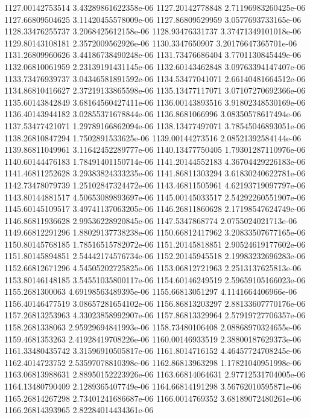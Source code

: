 {1127.00142753514 3.43289861622358e-06
1127.20142778848 2.71196983260425e-06
1127.66809504625 3.11420455578009e-06
1127.86809529959 3.0577693733165e-06
1128.33476255737 3.2068425612158e-06
1128.93476331737 3.37471349101018e-06
1129.80143108181 2.3572009562926e-06
1130.3347650907 3.20176647365701e-06
1131.26809960626 3.44186738490248e-06
1131.73476686404 3.7701130845449e-06
1132.06810061959 2.23139191431145e-06
1132.60143462848 3.09763394147407e-06
1133.73476939737 3.04346581891592e-06
1134.53477041071 2.66140481664512e-06
1134.86810416627 2.37219133865598e-06
1135.13477117071 3.07107270692366e-06
1135.60143842849 3.68164560427411e-06
1136.00143893516 3.91802348530169e-06
1136.40143944182 3.02855371678844e-06
1136.8681066996 3.08350578617494e-06
1137.53477421071 1.29789166862094e-06
1138.13477497071 3.78545046893051e-06
1138.26810847294 1.7502891533625e-06
1139.00144273516 2.08521392584144e-06
1139.86811049961 3.11642452289777e-06
1140.13477750405 1.79301287110976e-06
1140.60144476183 1.78491401150714e-06
1141.20144552183 4.36704429226183e-06
1141.46811252628 3.29383824333235e-06
1141.86811303294 3.61830240622781e-06
1142.73478079739 1.25102847324472e-06
1143.46811505961 4.62193719097797e-06
1143.80144881517 4.50653089893697e-06
1145.00145033517 2.54292260551907e-06
1145.60145109517 3.49741137063205e-06
1146.26811860628 2.17198547624749e-06
1146.86811936628 2.99536228920845e-06
1147.5347868774 2.0755024021713e-06
1149.66812291296 1.88029137738238e-06
1150.66812417962 3.20833507677165e-06
1150.80145768185 1.78516515782072e-06
1151.20145818851 2.90524619177602e-06
1151.80145894851 2.54442174576734e-06
1152.20145945518 2.19983232696283e-06
1152.66812671296 4.54505202725825e-06
1153.06812721963 2.2513137625813e-06
1153.80146148185 3.54551035800117e-06
1154.60146249519 2.59659105166023e-06
1155.2681300063 4.69198563489395e-06
1155.66813051297 4.1141664406966e-06
1156.40146477519 3.08657281654102e-06
1156.86813203297 2.88133607770176e-06
1157.26813253963 4.33023858992907e-06
1157.86813329964 2.57919727706357e-06
1158.2681338063 2.95929694841993e-06
1158.73480106408 2.08868970324655e-06
1159.4681353263 2.41928419708226e-06
1160.00146933519 2.38800187629373e-06
1161.33480435742 3.31596910505817e-06
1161.8014716152 4.46457724708245e-06
1162.4014723752 2.53597078810398e-06
1162.86813963298 1.17821040951998e-06
1163.06813988631 2.88950152223926e-06
1163.66814064631 2.97712531704005e-06
1164.13480790409 2.1289365407749e-06
1164.66814191298 3.56762010595871e-06
1165.26814267298 2.73401241686687e-06
1166.0014769352 3.68189072480261e-06
1166.26814393965 2.82284014434361e-06
}
